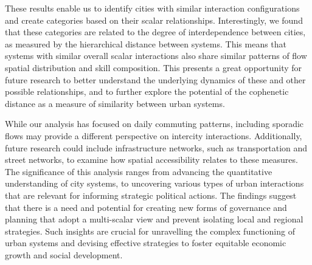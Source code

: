 \documentclass[11pt, a4paper]{article}
\begin{document}
These results enable us to identify cities with similar interaction configurations and create categories based on their scalar relationships. Interestingly, we found that these categories are related to the degree of interdependence between cities, as measured by the hierarchical distance between systems. This means that systems with similar overall scalar interactions also share similar patterns of flow spatial distribution and skill composition. This presents a great opportunity for future research to better understand the underlying dynamics of these and other possible relationships, and to further explore the potential of the cophenetic distance as a measure of similarity between urban systems.

While our analysis has focused on daily commuting patterns, including sporadic flows may provide a different perspective on intercity interactions. Additionally, future research could include infrastructure networks, such as transportation and street networks, to examine how spatial accessibility relates to these measures. The significance of this analysis ranges from advancing the quantitative understanding of city systems, to uncovering various types of urban interactions that are relevant for informing strategic political actions. The findings suggest that there is a need and potential for creating new forms of governance and planning that adopt a multi-scalar view and prevent isolating local and regional strategies. Such insights are crucial for unravelling the complex functioning of urban systems and devising effective strategies to foster equitable economic growth and social development.
\end{document}
